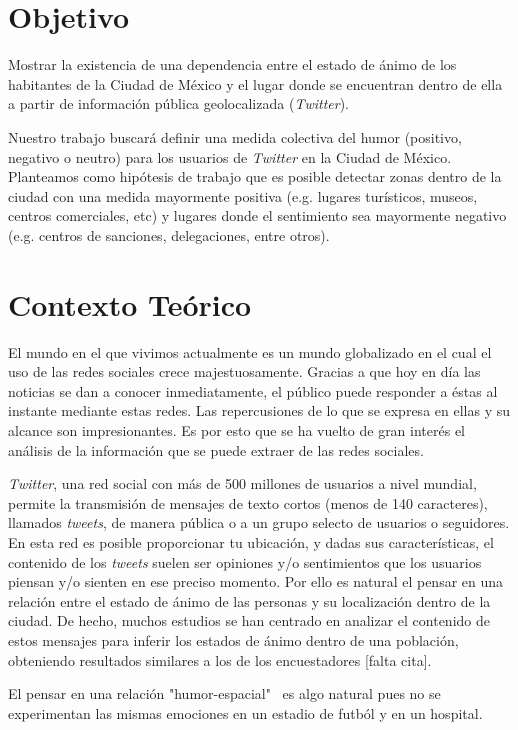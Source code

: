 \documentclass{article}
\author{}
\date{\today}
\title{}
\begin{document}
	\section{Objetivo}
		Mostrar la existencia de una dependencia entre el estado de ánimo de los habitantes de la Ciudad de México y el lugar donde se encuentran dentro de ella a partir de información pública geolocalizada (\emph{Twitter}).

		Nuestro trabajo buscará definir una medida colectiva del humor (positivo, negativo o neutro) para los usuarios de \emph{Twitter} en la Ciudad de México. Planteamos como hipótesis de trabajo que es posible detectar zonas dentro de la ciudad con una medida mayormente positiva (e.g. lugares turísticos, museos, centros comerciales, etc) y lugares donde el sentimiento sea mayormente negativo (e.g. centros de sanciones, delegaciones, entre otros). 


	\section{Contexto Teórico}
		El mundo en el que vivimos actualmente es un mundo globalizado en el cual el uso de las redes sociales crece majestuosamente. Gracias a que hoy en día las noticias se dan a conocer inmediatamente, el público puede responder a éstas al instante mediante estas redes. Las repercusiones de lo que se expresa en ellas y su alcance son impresionantes. Es por esto que se ha vuelto de gran interés el análisis de la información que se puede extraer de las redes sociales.

		\emph{Twitter}, una red social con más de 500 millones de usuarios a nivel mundial, permite la transmisión de mensajes de texto cortos (menos de 140 caracteres), llamados \emph{tweets}, de manera pública o a un grupo selecto de usuarios o seguidores. En esta red es posible proporcionar tu ubicación, y dadas sus características, el contenido de los \emph{tweets} suelen ser opiniones y/o sentimientos que los usuarios piensan y/o sienten en ese preciso momento. Por ello es natural el pensar en una relación entre el estado de ánimo de las personas y su localización dentro de la ciudad. De hecho, muchos estudios se han centrado en analizar el contenido de estos mensajes para inferir los estados de ánimo dentro de una población, obteniendo resultados similares a los de los encuestadores [falta cita].

		El pensar en una relación "humor-espacial" \ es algo natural pues no se experimentan las mismas emociones en un estadio de futból y en un hospital. 
\end{document}
